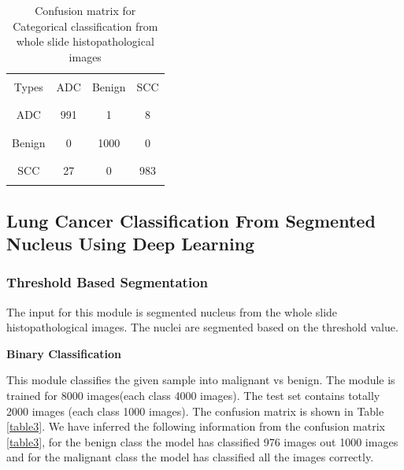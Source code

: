 \documentclass[conference]{IEEEtran}
\begin{document}
\begin{table}
\begin{center}
\begin{tabular}[scale=1.4]{ | c | c | c | c | }
  \hline        
   & & &\\
   Types & ADC & Benign & SCC \\
   & & & \\
   \hline
   & & &\\
   ADC & 991  & 1 & 8 \\
   & & &\\
   \hline
   & & &\\
   Benign & 0 & 1000 & 0 \\
   & & &\\
   \hline
   & & &\\
   SCC & 27 & 0 & 983 \\
   &  & &\\
  
  \hline  
\end{tabular}
\caption{Confusion matrix for Categorical classification from whole slide histopathological images }
\label{table2}
\end{center}
\end{table}




\subsection{Lung Cancer Classification From Segmented Nucleus Using Deep Learning}
\subsubsection{Threshold Based Segmentation}
The input for this module is segmented nucleus from the whole slide histopathological images. The nuclei are segmented based on the threshold value.

\newline
\textbf{Binary Classification}
%


This module classifies the given sample into malignant vs benign. The module is trained for 8000 images(each class 4000 images). The test set contains totally 2000 images (each class 1000 images). The confusion matrix is shown in Table \ref{table3}. We have inferred the following information from the confusion matrix \ref{table3}, for the benign class the model has classified 976 images out 1000 images and for the malignant class the model has classified all the images correctly. 
\end{document}
